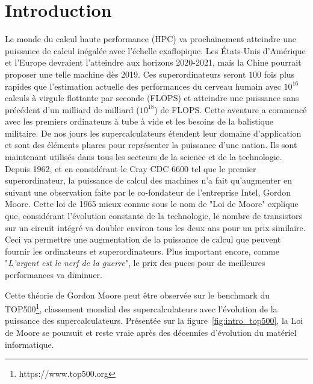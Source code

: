 \documentclass[12pt,a4paper]{report}
\begin{document}
\section*{Introduction}

Le monde du calcul haute performance (HPC) va prochainement atteindre une puissance de calcul inégalée avec l'échelle exaflopique.
Les \'Etats-Unis d'Amérique et l'Europe devraient l'atteindre aux horizons 2020-2021, mais la Chine pourrait proposer une telle machine dès 2019.
Ces superordinateurs seront $100$ fois plus rapides que l'estimation actuelle des performances du cerveau humain avec $10^{16}$ calculs à virgule flottante par seconde (FLOPS)\cite{kurzweil2010singularity} et atteindre une puissance sans précédent d'un milliard de milliard ($10^{18}$) de FLOPS.
Cette aventure a commencé avec les premiers ordinateurs à tube à vide et les besoins de la balistique militaire. 
De nos jours les supercalculateurs étendent leur domaine d'application et sont des éléments phares pour représenter la puissance d'une nation.
Ils sont maintenant utilisés dans tous les secteurs de la science et de la technologie.\\

Depuis 1962, et en considérant le Cray CDC 6600 tel que le premier superordinateur, la puissance de calcul des machines n'a fait qu'augmenter en suivant une observation faite par le co-fondateur de l'entreprise Intel, Gordon Moore. 
Cette loi de 1965 mieux connue sous le nom de "Loi de Moore" explique que, considérant l'évolution constante de la technologie, le nombre de transistors sur un circuit intégré va doubler environ tous les deux ans pour un prix similaire. 
Ceci va permettre une augmentation de la puissance de calcul que peuvent fournir les ordinateurs et superordinateurs. 
Plus important encore, comme "\textit{L'argent est le nerf de la guerre}", le prix des puces pour de meilleures performances va diminuer. 

Cette théorie de Gordon Moore peut être observée sur le benchmark du TOP500\footnote{https://www.top500.org}, classement mondial des supercalculateurs avec l'évolution de la puissance des supercalculateurs.
Présentée sur la figure~\ref{fig:intro_top500}, la Loi de Moore se poursuit et reste vraie après des décennies d'évolution du matériel informatique.
\end{document}
